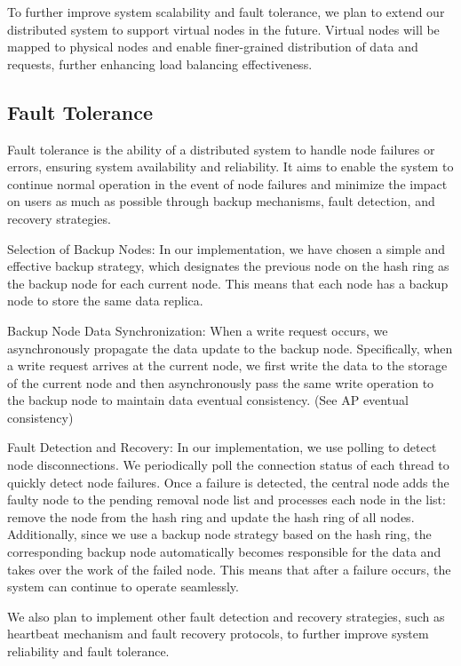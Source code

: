 \documentclass[sigconf]{acmart}
\begin{document}
To further improve system scalability and fault tolerance, we plan to extend our distributed system to support virtual nodes in the future. Virtual nodes will be mapped to physical nodes and enable finer-grained distribution of data and requests, further enhancing load balancing effectiveness.


\subsection{Fault Tolerance}

Fault tolerance\cite{jalote1994fault} is the ability of a distributed system to handle node failures or errors, ensuring system availability and reliability. It aims to enable the system to continue normal operation in the event of node failures and minimize the impact on users as much as possible through backup mechanisms, fault detection, and recovery strategies.

Selection of Backup Nodes: In our implementation, we have chosen a simple and effective backup strategy, which designates the previous node on the hash ring as the backup node for each current node. This means that each node has a backup node to store the same data replica.

Backup Node Data Synchronization: When a write request occurs, we asynchronously propagate the data update to the backup node. Specifically, when a write request arrives at the current node, we first write the data to the storage of the current node and then asynchronously pass the same write operation to the backup node to maintain data eventual consistency. (See AP eventual consistency)

Fault Detection and Recovery: In our implementation, we use polling to detect node disconnections. We periodically poll the connection status of each thread to quickly detect node failures. Once a failure is detected, the central node adds the faulty node to the pending removal node list and processes each node in the list: remove the node from the hash ring and update the hash ring of all nodes. Additionally, since we use a backup node strategy based on the hash ring, the corresponding backup node automatically becomes responsible for the data and takes over the work of the failed node. This means that after a failure occurs, the system can continue to operate seamlessly.

We also plan to implement other fault detection and recovery strategies, such as heartbeat mechanism and fault recovery protocols, to further improve system reliability and fault tolerance.
\end{document}
